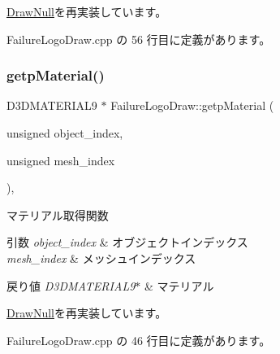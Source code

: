 \mbox{\hyperlink{class_draw_null_a98cc7cd43b19d9d70cc621d23d89286f}{Draw\+Null}}を再実装しています。



 Failure\+Logo\+Draw.\+cpp の 56 行目に定義があります。

\mbox{\label{class_failure_logo_draw_a60b0cd983365acdad363cdaf8ebdef46}} 
\subsubsection{\texorpdfstring{getp\+Material()}{getpMaterial()}}
{\footnotesize\ttfamily D3\+D\+M\+A\+T\+E\+R\+I\+A\+L9 $\ast$ Failure\+Logo\+Draw\+::getp\+Material (\begin{DoxyParamCaption}\item[{unsigned}]{object\+\_\+index,  }\item[{unsigned}]{mesh\+\_\+index }\end{DoxyParamCaption})\hspace{0.3cm}{\ttfamily [override]}, {\ttfamily [virtual]}}



マテリアル取得関数 


\begin{DoxyParams}{引数}
{\em object\+\_\+index} & オブジェクトインデックス \\
\hline
{\em mesh\+\_\+index} & メッシュインデックス \\
\hline
\end{DoxyParams}

\begin{DoxyRetVals}{戻り値}
{\em D3\+D\+M\+A\+T\+E\+R\+I\+A\+L9$\ast$} & マテリアル \\
\hline
\end{DoxyRetVals}


\mbox{\hyperlink{class_draw_null_a0c1efe55fea325ad277594be6fe1e938}{Draw\+Null}}を再実装しています。



 Failure\+Logo\+Draw.\+cpp の 46 行目に定義があります。

\mbox{\label{class_failure_logo_draw_a6e6fb80dc21af9318d659bc3fa71c0b5}} 
